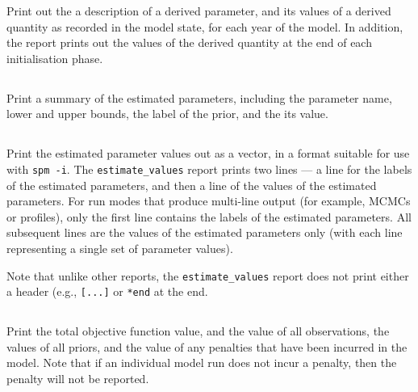 Print out the a description of a derived parameter, and its values of a derived quantity as recorded in the model state, for each year of the model. In addition, the report prints out the values of the derived quantity at the end of each initialisation phase.

\subsection{}

Print a summary of the estimated parameters, including the parameter name, lower and upper bounds, the label of the prior, and the its value.

\subsection{}

Print the estimated parameter values out as a vector, in a format suitable for use with \texttt{spm -i}. The \texttt{estimate\_values} report prints two lines --- a line for the labels of the estimated parameters, and then a line of the values of the estimated parameters. For run modes that produce multi-line output (for example, MCMCs or profiles), only the first line contains the labels of the  estimated parameters. All subsequent lines are the values of the estimated parameters only (with each line representing a single set of parameter values). 

Note that unlike other reports, the \texttt{estimate\_values} report does not print either a header (e.g., \texttt{[...]} or \texttt{*end} at the end. 

\subsection{}

Print the total objective function value, and the value of all observations, the values of all priors, and the value of any penalties that have been incurred in the model. Note that if an individual model run does not incur a penalty, then the penalty will not be reported.

\subsection{}

